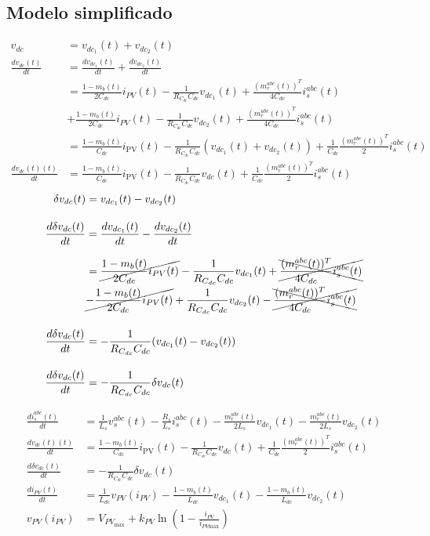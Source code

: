 \documentclass[11pt, a4paper]{article}
\newcommand{\der}[1]{\frac{d #1(t)}{dt}}
\begin{document}
\subsection*{Modelo simplificado}
\begin{align*}
    v_{dc}&=v_{dc_1}(t)+v_{dc_2}(t) \\[10pt]
    \der{v_{dc}}&=\der{v_{dc_1}}+\der{v_{dc_2}} \\ 
    &=\frac{1 - m_{b}(t)}{2 C_{dc}} i_{PV}(t) - \frac{1}{R_{C_{dc}} C_{dc}} v_{dc_1}(t) + \frac{(m_r^{abc}(t))^T}{4 C_{dc}} i_{s}^{abc}(t) \\ &+ \frac{1 - m_{b}(t)}{2 C_{dc}} i_{PV}(t) - \frac{1}{R_{C_{dc}} C_{dc}} v_{dc_2}(t) + \frac{(m_r^{abc}(t))^T}{4 C_{dc}} i_{s}^{abc}(t) \\[10pt]
    &=\frac{1-m_b(t)}{C_{dc}}i_{\text{PV}}(t)-\frac{1}{R_{C_{dc}}C_{dc}}(v_{dc_1}(t)+v_{dc_2}(t))+\frac{1}{C_{dc}}\frac{(m_r^{abc}(t))^T}{2}i_s^{abc}(t) \\[10pt]
     \der{v_{dc}(t)}&=\frac{1-m_b(t)}{C_{dc}}i_{\text{PV}}(t)-\frac{1}{R_{C_{dc}}C_{dc}}v_{dc}(t)+\frac{1}{C_{dc}}\frac{(m_r^{abc}(t))^T}{2}i_s^{abc}(t)
\end{align*}
\begin{align*}
    \delta v_{dc}(t) &= v_{dc_1}(t) - v_{dc_2}(t) \\[10pt]
    \der{\delta v_{dc}} &= \der{v_{dc_1}}-\der{v_{dc_2}}\\[10pt]
    &=\cancel{\frac{1 - m_{b}(t)}{2 C_{dc}} i_{PV}(t)} - \frac{1}{R_{C_{dc}} C_{dc}} v_{dc_1}(t) + \xcancel{\frac{(m_r^{abc}(t))^T}{4 C_{dc}} i_{s}^{abc}(t)}  \\ &\cancel{- \frac{1 - m_{b}(t)}{2 C_{dc}} i_{PV}(t)} + \frac{1}{R_{C_{dc}} C_{dc}} v_{dc_2}(t) - \xcancel{\frac{(m_r^{abc}(t))^T}{4 C_{dc}} i_{s}^{abc}(t)} \\[10pt]
    \der{\delta v_{dc}}&= -\frac{1}{R_{C_{dc}} C_{dc}}(v_{dc_1}(t)-v_{dc_2}(t)) \\[10pt]
    \der{\delta v_{dc}}&= -\frac{1}{R_{C_{dc}} C_{dc}}\delta v_{dc}(t)
\end{align*}

\begin{align*}
    \frac{d i_{s}^{abc}(t)}{d t} &= \frac{1}{L_{s}} v_{s}^{abc}(t) - \frac{R_{s}}{L_{s}} i_{s}^{abc}(t) - \frac{m_r^{abc}(t)}{2 L_s} v_{dc_1}(t) - \frac{m_r^{abc}(t)}{2 L_s} v_{dc_2}(t) \\[12pt]
    \der{v_{dc}(t)}&=\frac{1-m_b(t)}{C_{dc}}i_{\text{PV}}(t)-\frac{1}{R_{C_{dc}}C_{dc}}v_{dc}(t)+\frac{1}{C_{dc}}\frac{(m_r^{abc}(t))^T}{2}i_s^{abc}(t) \\[12pt]
    \der{\delta v_{dc}}&= -\frac{1}{R_{C_{dc}} C_{dc}}\delta v_{dc}(t)\\[12pt]
    \frac{d i_{PV}(t)}{d t} &= \frac{1}{L_{dc}} v_{PV}(i_{PV}) - \frac{1 - m_{b}(t)}{L_{dc}} v_{dc_1}(t) - \frac{1 - m_{b}(t)}{L_{dc}} v_{dc_2}(t) \\[12pt]
    v_{PV}(i_{PV})&=V_{PV_\text{max}}+k_{PV}\ln\left(1-\frac{i_{PV}}{i_{PV\text{max}}}\right)
\end{align*}
\end{document}
